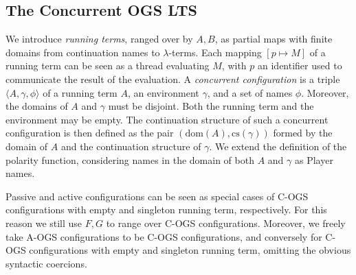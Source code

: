 \documentclass[11pt,a4paper]{amsart}
\theoremstyle{plain}
\theoremstyle{definition}
\theoremstyle{defC}
\theoremstyle{thmC}
\theoremstyle{plain}
\numberwithin{equation}{section}
\newcommand{\AOGS}{\mbox{{\rm A-OGS}}\xspace}      %
\newcommand{\COGS}{\mbox{{\rm C-OGS}}\xspace}      %
\newcommand{\Support}{support\xspace}      %
\newcommand{\Supports}{supports\xspace}      %
\newcommand{\FF}{F}
\newcommand{\GG}{G}
\newcommand{\dom}[1]{\mathrm{dom}(#1)}
\newcommand{\pmap}[2]{[#1 \mapsto #2]}
\newcommand{\conf}[1]{\langle #1\rangle}
\newcommand{\cs}{\mathrm{cs}}
\theoremstyle{plain}
\theoremstyle{definition}
\begin{document}
\subsection{The Concurrent OGS LTS}
\label{ss:cs_cogs-lts}


We introduce \emph{running terms}, ranged over by $A,B$,
as partial maps with finite domains 
from continuation names to $\lambda$-terms.
Each mapping $\pmap{p}{M}$ of a running term can be seen as
a thread evaluating $M$, with $p$ an identifier
used to communicate the result of the evaluation.
%
A \emph{concurrent configuration} is a triple $ \conf{A,\gamma,\phi}$ 
of a running term $A$, an environment 
$\gamma$, and a set of names $\phi$.
Moreover, the domains of $A$ and $\gamma$
must be disjoint.
Both the running term and the environment may be empty.
The continuation structure of such a concurrent configuration
is then defined as the pair $(\dom{A},\cs(\gamma))$
formed by the domain of $A$ and the continuation structure of $\gamma$.
We extend the definition of the polarity function,
considering names in the domain of both $A$ and $\gamma$ as Player names. 
%

% 


Passive and active configurations
can be seen as special cases of \COGS configurations with empty and singleton
running term, respectively.
For this reason we still use $\FF, \GG$ to range
over \COGS configurations. Moreover, we freely take  \AOGS
configurations to be  \COGS configurations, 
and conversely for \COGS configurations
with empty and singleton running term, 
omitting the obvious syntactic coercions. 
\end{document}
